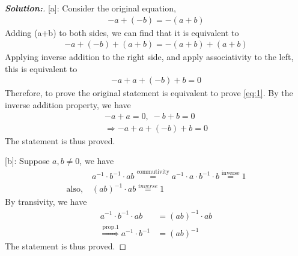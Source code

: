 \documentclass[12pt]{article}
\theoremstyle{definition}\newtheorem{problem}{Problem}
\newenvironment{solution}{\begin{proof}[\bfseries\textup{Solution:}]}{\end{proof}}
\begin{document}
\begin{solution}
[a]:
Consider the original equation, \begin{align} 
    -a + (-b) = -(a+b) 
\end{align}
Adding (a+b) to both sides, we can find that it is equivalent to \begin{align} 
    -a +(-b) + (a+b) = -(a+b)+(a+b) 
\end{align}
Applying inverse addition to the right side, and apply associativity to the left, this is equivalent to 
\begin{align} \label{eq:1}
     -a +a +(-b) +b = 0
\end{align}
Therefore, to prove the original statement is equivalent to prove \autoref{eq:1}.
By the inverse addition property, we have \begin{align} 
    -a + a = 0 , \; -b + b = 0 \\
    \Rightarrow -a + a + (-b) + b = 0
\end{align}
The statement is thus proved.

[b]:
Suppose $ a, b \neq 0 $, we have\begin{align} 
    &a^{-1} \cdot b^{-1} \cdot ab \stackrel{\text{commutivity}}{=} a^{-1} \cdot a \cdot b^{-1} \cdot b \stackrel{\text{inverse}}{=}1 \\
 \text{also,} \; &(ab)^{-1} \cdot ab \stackrel{inverse}{=} 1
\end{align}
By transivity, we have \begin{align} 
    a^{-1} \cdot b^{-1} \cdot ab &= (ab)^{-1} \cdot ab \\
    \stackrel{\text{prop.1}}{\Rightarrow} a^{-1} \cdot b^{-1} &= (ab)^{-1}
\end{align}
The statement is thus proved.
\end{solution}
\end{document}
